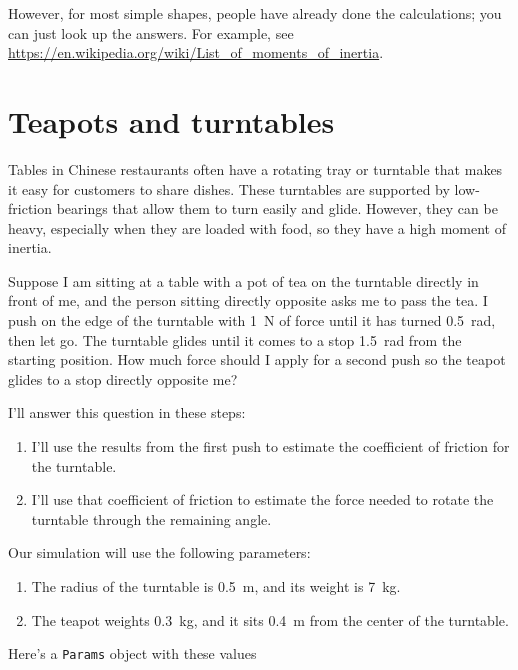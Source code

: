 \documentclass[12pt]{book}
\theoremstyle{exercise}
\begin{document}
However, for most simple shapes, people have already done the calculations; you can just look up the answers.  For example, see \url{https://en.wikipedia.org/wiki/List_of_moments_of_inertia}.


\section{Teapots and turntables}

Tables in Chinese restaurants often have a rotating tray or turntable
that makes it easy for customers to share dishes. These turntables are
supported by low-friction bearings that allow them to turn easily and
glide. However, they can be heavy, especially when they are loaded with
food, so they have a high moment of inertia.

Suppose I am sitting at a table with a pot of tea on the turntable
directly in front of me, and the person sitting directly opposite asks
me to pass the tea. I push on the edge of the turntable with \SI{1}{\newton} of force until it has turned \SI{0.5}{\radian}, then let go. The turntable glides
until it comes to a stop \SI{1.5}{\radian} from the starting position. How
much force should I apply for a second push so the teapot glides to a
stop directly opposite me?

I'll answer this question in these steps:

\begin{enumerate}

\item
  I'll use the results from the first push to estimate the coefficient
  of friction for the turntable.

\item
  I'll use that coefficient of friction to estimate the force needed to
  rotate the turntable through the remaining angle.

\end{enumerate}

Our simulation will use the following parameters:

\begin{enumerate}
\item
  The radius of the turntable is \SI{0.5}{\meter}, and its weight is \SI{7}{\kg}.
\item
  The teapot weights \SI{0.3}{\kg}, and it sits \SI{0.4}{\meter} from the center of
  the turntable.
\end{enumerate}

Here's a \texttt{Params} object with these values
\end{document}
